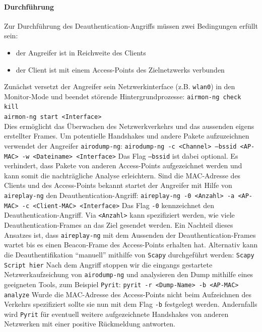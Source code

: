 \paragraph{Durchführung}
Zur Durchführung des Deauthentication-Angriffs müssen zwei Bedingungen erfüllt sein: 
\begin{itemize}
	\item der Angreifer ist in Reichweite des Clients
	\item der Client ist mit einem Access-Points des Zielnetzwerks verbunden 
\end{itemize}
Zunächst versetzt der Angreifer sein Netzwerkinterface (z.B. \texttt{wlan0}) in den Monitor-Mode und beendet störende Hintergrundprozesse:
\texttt{airmon-ng check kill}\\
\texttt{airmon-ng start <Interface>}\\
Dies ermöglicht das Überwachen des Netzwerkverkehrs und das aussenden eigens erstellter Frames.
Um potentielle Handshakes und andere Pakete aufzuzeichnen verwendet der Angreifer \texttt{airodump-ng}:
\texttt{airodump-ng -c <Channel> --bssid <AP-MAC> -w <Dateiname> <Interface>}
Das Flag \texttt{--bssid} ist dabei optional.
Es verhindert, dass Pakete von anderen Access-Points aufgezeichnet werden und kann somit die nachträgliche Analyse erleichtern.
Sind die MAC-Adresse des Clients und des Access-Points bekannt startet der Angreifer mit Hilfe von \texttt{aireplay-ng} den Deauthentication-Angriff: 
\texttt{aireplay-ng -0 <Anzahl> -a <AP-MAC> -c <Client-MAC> <Interface>}
Das Flag \texttt{-0} kennzeichnet den Deauthentication-Angriff.
Via \texttt{<Anzahl>} kann spezifiziert werden, wie viele Deauthentication-Frames an das Ziel gesendet werden.
Ein Nachteil dieses Ansatzes ist, dass \texttt{aireplay-ng} mit dem Aussenden der Deauthentication-Frames wartet bis es einen Beacon-Frame des Access-Points erhalten hat.
Alternativ kann die Deauthentifikation \enquote{manuell} mithilfe von \texttt{Scapy} durchgeführt werden:
\texttt{Scapy Script hier}
Nach dem Angriff stoppen wir die eingangs gestartete Netzwerkaufzeichung von \texttt{airodump-ng} und analysieren den Dump mithilfe eines geeigneten Tools, zum Beispiel \texttt{Pyrit}:
\texttt{pyrit -r <Dump-Name> -b <AP-MAC> analyze}
Wurde die MAC-Adresse des Access-Points nicht beim Aufzeichnen des Verkehrs spezifiziert sollte sie nun mit dem Flag \texttt{-b} festgelegt werden.
Andernfalls wird \texttt{Pyrit} für eventuell weitere aufgezeichnete Handshakes von anderen Netzwerken mit einer positive Rückmeldung antworten.

